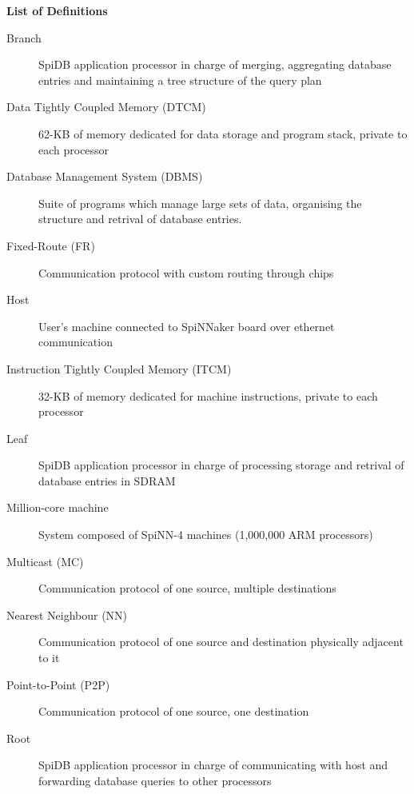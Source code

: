 \vspace*{1.2cm}
{ \huge \bfseries List of Definitions}
\vspace{7mm}

\small
\begin{description}

  \item[Branch] SpiDB application processor in charge of merging, aggregating database entries and maintaining a tree structure of the query plan

  \item[Data Tightly Coupled Memory (DTCM)] 62-KB of memory dedicated for data storage and program stack, private to each processor
  
  \item[Database Management System (DBMS)] Suite of programs which manage large sets of data, organising the structure and retrival of database entries.\cite{dbmsdef}
   
  \item[Fixed-Route (FR)] Communication protocol with custom routing through chips   
    
  \item[Host] User's machine connected to SpiNNaker board over ethernet communication    
    
  \item[Instruction Tightly Coupled Memory (ITCM)] 32-KB of memory dedicated for machine instructions, private to each processor    
    
  \item[Leaf] SpiDB application processor in charge of processing storage and retrival of database entries in SDRAM    
    
  \item[Million-core machine] System composed of  SpiNN-4 machines (1,000,000 ARM processors)   
  
  \item[Multicast (MC)] Communication protocol of one source, multiple destinations    

  \item[Nearest Neighbour (NN)] Communication protocol of one source and destination physically adjacent to it

  \item[Point-to-Point (P2P)] Communication protocol of one source, one destination    
  
  \item[Root] SpiDB application processor in charge of communicating with host and forwarding database queries to other processors
  

\end{description}
